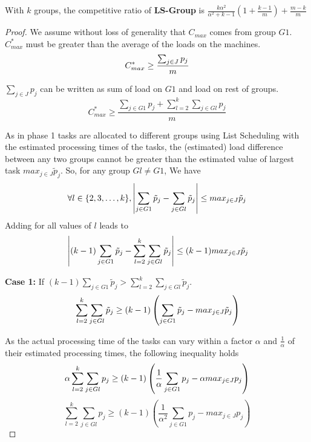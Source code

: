 \documentclass[twocolumn]{svjour3}
\begin{document}
\begin{theorem}
  \label{th:strategy3}
  With $k$ groups, the competitive ratio of
  \textbf{LS-Group } is $ \frac{k\alpha^{2}}{\alpha^{2}+k-1} (1+
  {\frac{k-1}{m}} ) + \frac{m-k}{m}$
\end{theorem}
\begin{proof} 
  We assume without loss of generality that $ C_{max}$ comes from
  group $G1$. $C_{max}^{*}$ must be greater than the average of the
  loads on the machines.
  \begin{equation}{\nonumber}
    C_{max}^{*} \geq  \frac{\sum_{j \in J}^{}{{p_{j}}}}{m}
  \end{equation}

  $\sum_{j \in J }{{p_{j}}}$ can be written as sum of load on $G1$ and
  load on rest of groups.
  \begin{equation}\label{eq11}
    C_{max}^{*} \geq  \frac{\sum_{j \in G1 }^{}{{p_{j}}}+ \sum_{l=2}^{k}\sum_{j \in Gl }^{}{{p_{j}}}}{m}
  \end{equation}

  As in phase 1 tasks are allocated to different groups using List
  Scheduling with the estimated processing times of the tasks, the
  (estimated) load difference between any two groups cannot be greater
  than the estimated value of largest task ${max_{j \in J}}{\tilde
    p_{j}}$.  So, for any group $Gl \neq G1$, We have
  \begin{equation}{\nonumber}
\forall l \in \{2, 3, \dots ,k\}, \left |\sum_{j \in G1 }^{}{\tilde p_{j}}- \sum_{j \in Gl }^{}{\tilde p_{j}} \right | \leq {max_{j \in J}}{\tilde p_{j}}
  \end{equation}  
  Adding for all values of $l$ leads to
  \begin{equation}{\nonumber}
    \left | (k-1)\sum_{j \in G1 }^{}{\tilde p_{j}}- \sum_{l=2}^{k}\sum_{j \in Gl }^{}{\tilde p_{j}} \right | \leq (k-1) {max_{j \in J}}{\tilde p_{j}}
  \end{equation}

  \textbf{Case 1:} If $(k-1)\sum_{j \in G1 }^{}{\tilde p_{j}} >
  \sum_{l=2}^{k}\sum_{j \in Gl }^{}{\tilde p_{j}}$.
  \begin{equation}{\nonumber}
    \sum_{l=2}^{k}\sum_{j \in Gl }^{}{\tilde p_{j}} \geq (k-1) \left( \sum_{j \in G1 }^{}{\tilde p_{j}}- {max_{j \in J}}{\tilde p_{j}} \right)
  \end{equation}

  As the actual processing time of the tasks can vary within a factor
  $\alpha$ and $\frac{1}{\alpha}$ of their estimated processing times,
  the following inequality holds
  \begin{equation}{\nonumber}
    \alpha\sum_{l=2}^{k}\sum_{j \in Gl }^{}{{p_{j}}} \geq (k-1) \left( \frac{1}{\alpha}\sum_{j \in G1 }^{}{{p_{j}}}- \alpha {max_{j \in J}}{{p_{j}}} \right)
  \end{equation}
  \begin{equation}\label{eq9}
    \sum_{l=2}^{k}\sum_{j \in Gl }^{}{{p_{j}}} \geq (k-1) \left(\frac{1}{\alpha^{2}}\sum_{j \in G1 }^{}{{p_{j}}}-  {max_{j \in J}}{{p_{j}}} \right)
  \end{equation}


\end{proof}
\end{document}
